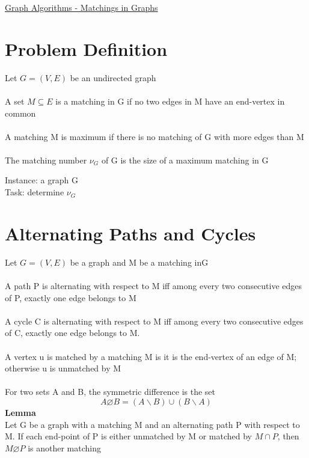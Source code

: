 \documentclass{article}[18pt]
\begin{document}
\begin{center}
\underline{\huge Graph Algorithms - Matchings in Graphs}
\end{center}

\section{Problem Definition}
Let $G=(V,E)$ be an undirected graph\\
\\
A set $M\subseteq E$ is a matching in G if no two edges in M have an end-vertex in common\\
\\
A matching M is maximum if there is no matching of G with more edges than M\\
\\
The matching number $\nu_G$ of G is the size of a maximum matching in G
\begin{defin}[Matching]
Instance: a graph G\\
Task: determine $\nu_G$
\end{defin}
\section{Alternating Paths and Cycles}
Let $G=(V,E)$ be a graph and M be a matching inG\\
\\
A path P is alternating with respect to M iff among every two consecutive edges of P, exactly one edge belongs to M\\
\\
A cycle C is alternating with respect to M iff among every two consecutive edges of C, exactly one edge belongs to M.\\
\\
A vertex u is matched by a matching M is it is the end-vertex of an edge of M; otherwise u is unmatched by M\\
\\
For two sets A and B, the symmetric difference is the set
$$A\varnothing B = (A \backslash B)\cup (B \backslash A)$$
\textbf{Lemma}\\
Let G be a graph with a matching M and an alternating path P with respect to M. If each end-point of P is either unmatched by M or matched by $M\cap P$, then $M \varnothing P$ is another matching
\end{document}
